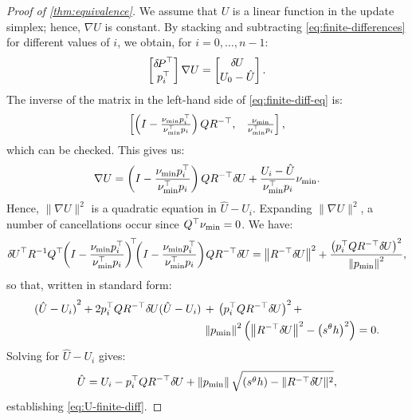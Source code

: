 \documentclass{article}
\begin{document}
\begin{proof}[Proof of \cref{thm:equivalence}]
  We assume that $U$ is a linear function in the update simplex;
  hence, $\nabla U$ is constant. By stacking and subtracting
  \cref{eq:finite-differences} for different values of $i$, we obtain,
  for $i = 0, \hdots, n - 1$:
  \begin{equation}\label{eq:finite-diff-eq}
    \begin{bmatrix}
      {\delta \hspace{-0.14em} P}^\top \\
      p_i^\top
    \end{bmatrix} \nabla U = \begin{bmatrix}
      {\delta \hspace{-0.09em} U} \\
      U_0 - \hat{U}
    \end{bmatrix}.
  \end{equation}
  The inverse of the matrix in the left-hand side of \cref{eq:finite-diff-eq} is:
  \begin{equation}
    \begin{bmatrix}
      \left(I - \frac{\nu_{\operatorname{min}} p_i^\top}{\nu_{\operatorname{min}}^\top p_i}\right) Q R^{-\top}, &
      \frac{\nu_{\operatorname{min}}}{\nu_{\operatorname{min}}^\top p_i}
    \end{bmatrix},
  \end{equation}
  which can be checked. This gives us:
  \begin{equation}
    \nabla U = \left(I - \frac{\nu_{\operatorname{min}} p_i^\top}{\nu_{\operatorname{min}}^\top p_i}\right) Q R^{-\top} {\delta \hspace{-0.09em} U} + \frac{U_i - \hat{U}}{\nu_{\operatorname{min}}^\top p_i} \nu_{\operatorname{min}}.
  \end{equation}
  Hence, $\|\nabla U\|^2$ is a quadratic equation in
  $\hat{U} - U_i$. Expanding $\|\nabla U\|^2$, a number of
  cancellations occur since $Q^\top \nu_{\operatorname{min}} = 0$. We have:
  \begin{equation}
    {\delta \hspace{-0.09em} U}^\top R^{-1} Q^\top \hspace{-0.25em} \left(I - \frac{\nu_{\operatorname{min}} p_i^\top}{\nu_{\operatorname{min}}^\top p_i}\right)^{\hspace{-0.25em}\top} \hspace{-0.4em} \left(I - \frac{\nu_{\operatorname{min}} p_i^\top}{\nu_{\operatorname{min}}^\top p_i}\right) \hspace{-0.1em} Q R^{-\top} {\delta \hspace{-0.09em} U} = \left\|R^{-\top} {\delta \hspace{-0.09em} U}\right\|^2 + \frac{\left(p_i^\top Q R^{-\top} {\delta \hspace{-0.09em} U}\right)^2}{\left\|p_{\operatorname{min}}\right\|^2},
  \end{equation}
  so that, written in standard form:
  \begin{equation}
    \begin{aligned}
      {(\hat{U} - U_i)}^2 + 2 p_i^\top Q R^{-\top} {\delta \hspace{-0.09em} U} {(\hat{U} - U_i)} \,&+\, \left(p_i^\top Q R^{-\top} {\delta \hspace{-0.09em} U}\right)^2 + \\
       &\left\|p_{\operatorname{min}}\right\|^2 \left(\left\|R^{-\top} {\delta \hspace{-0.09em} U}\right\|^2 - \left(s^\theta h\right)^2\right) = 0.
    \end{aligned}
  \end{equation}
  Solving for $\hat{U} - U_i$ gives:
  \begin{equation}
    \hat{U} = U_i - p_i^\top Q R^{-\top} {\delta \hspace{-0.09em} U} + \left\|p_{\operatorname{min}}\right\| \sqrt{\left(s^\theta h\right) - \|R^{-\top} {\delta \hspace{-0.09em} U}\|^2},
  \end{equation}
  establishing \cref{eq:U-finite-diff}.


\end{proof}
\end{document}
